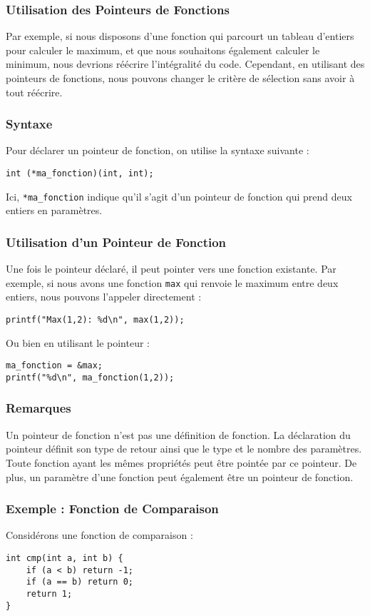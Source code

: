 \documentclass[french,11pt]{article}
\begin{document}
\subsubsection{Utilisation des Pointeurs de Fonctions}
Par exemple, si nous disposons d'une fonction qui parcourt un tableau d'entiers pour calculer le maximum, et que nous souhaitons également calculer le minimum, nous devrions réécrire l'intégralité du code. Cependant, en utilisant des pointeurs de fonctions, nous pouvons changer le critère de sélection sans avoir à tout réécrire.

\subsubsection{Syntaxe}
Pour déclarer un pointeur de fonction, on utilise la syntaxe suivante :
\begin{verbatim}
int (*ma_fonction)(int, int);
\end{verbatim}
Ici, \texttt{*ma\_fonction} indique qu'il s'agit d'un pointeur de fonction qui prend deux entiers en paramètres.

\subsubsection{Utilisation d'un Pointeur de Fonction}
Une fois le pointeur déclaré, il peut pointer vers une fonction existante. Par exemple, si nous avons une fonction \texttt{max} qui renvoie le maximum entre deux entiers, nous pouvons l'appeler directement :
\begin{verbatim}
printf("Max(1,2): %d\n", max(1,2));
\end{verbatim}
Ou bien en utilisant le pointeur :
\begin{verbatim}
ma_fonction = &max;
printf("%d\n", ma_fonction(1,2));
\end{verbatim}

\subsubsection{Remarques}
Un pointeur de fonction n'est pas une définition de fonction. La déclaration du pointeur définit son type de retour ainsi que le type et le nombre des paramètres. Toute fonction ayant les mêmes propriétés peut être pointée par ce pointeur. De plus, un paramètre d'une fonction peut également être un pointeur de fonction.

\subsubsection{Exemple : Fonction de Comparaison}
Considérons une fonction de comparaison :
\begin{verbatim}
int cmp(int a, int b) {
    if (a < b) return -1;
    if (a == b) return 0;
    return 1;
}
\end{verbatim}
\end{document}

